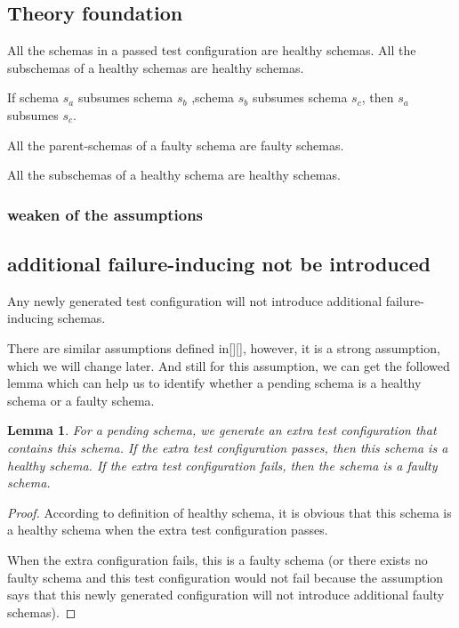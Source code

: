 \documentclass[10pt,journal,cspaper,compsoc]{IEEEtran}
\begin{document}
\subsection{Theory foundation}
\begin{proposition}
All the schemas in a passed test configuration are healthy schemas.
All the subschemas of a healthy schemas are healthy schemas.
\end{proposition}
\begin{proposition}
If schema $s_{a}$ subsumes  schema $s_{b}$ ,schema  $s_{b}$ subsumes schema $s_{c}$, then $s_{a}$  subsumes $s_{c}$.
\end{proposition}
\begin{proposition}
All the parent-schemas of a faulty schema are faulty schemas.
\end{proposition}
\begin{proposition}
All the subschemas of a healthy schema are healthy schemas.
\end{proposition}

\subsubsection{weaken of the assumptions}


\subsection{additional failure-inducing not be introduced}
\begin{assumption}
Any newly generated test configuration will not introduce additional failure-inducing schemas.
\end{assumption}

There are similar assumptions defined in[][], however, it is a strong assumption, which we will change later. And still for this assumption, we can get the followed lemma which can help us to identify whether a pending schema is a healthy schema or a faulty schema.
\newtheorem{lemma}{Lemma}
\begin{lemma}
For a pending schema, we generate an extra test configuration that contains this schema. If the extra test configuration passes, then this schema is a healthy schema. If the extra test configuration fails, then the schema is a faulty schema.
\end{lemma}
\begin{proof}
According to definition of healthy schema, it is obvious that this schema is a healthy schema when the extra test configuration passes.

When the extra configuration fails, this is a faulty schema (or there exists no faulty schema and this test configuration would not fail because the assumption says that this newly generated configuration will not introduce additional faulty schemas).
\end{proof}
\end{document}
